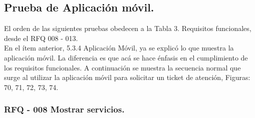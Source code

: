 \subsection{Prueba de Aplicación móvil.}

El orden de las siguientes pruebas obedecen a la Tabla 3. Requisitos funcionales, desde el RFQ 008 - 013.\\

En el ítem anterior, 5.3.4 Aplicación Móvil, ya se explicó lo que muestra la aplicación móvil. La diferencia es que acá se hace énfasis en el cumplimiento de los requisitos funcionales. A continuación se muestra la secuencia normal que surge al utilizar la aplicación móvil para solicitar un ticket de atención, Figuras: 70, 71, 72, 73, 74. 

\subsubsection{RFQ - 008 Mostrar servicios.}

